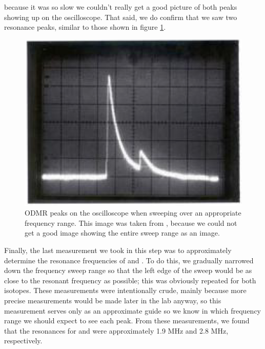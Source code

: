 \documentclass[10pt]{article}
\begin{document}
	because it was so slow we couldn't
	really get a good picture of both peaks showing up on the oscilloscope. That
	said, we do confirm that we saw two resonance peaks, similar to those shown in
	figure \ref{ODMR}. 
	\begin{figure}
		\centering
		\includegraphics[scale=0.5]{images/ODMR.png}
		\caption{ODMR peaks on the oscilloscope when sweeping over an appropriate
			frequency range. This image was taken from \cite{lab-manual}, 
			because we could
		not get a good image showing the entire sweep range as an image.}   
		\label{ODMR}
	\end{figure}
	Finally, the last measurement we took in this step was to approximately determine
	the resonance frequencies of  and . To do this, we
	gradually narrowed down the frequency sweep range so that the left edge of the sweep
	would be as close to the resonant frequency as possible; this was obviously
	repeated for both isotopes. These measurements were intentionally crude, mainly
	because more precise measurements would be made later in the lab anyway, so this
	measurement serves only as an approximate guide so we know in which frequency
	range we should expect to see each peak. From these
	measurements, we found that the resonances for  and  were
	approximately 1.9 MHz and 2.8 MHz, respectively. %
\end{document}
